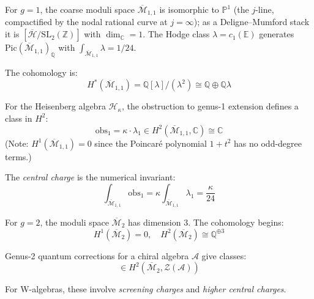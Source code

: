 \begin{example}
\label{ex:genus-1-obstruction-complete}
For $g=1$, the coarse moduli space $\overline{\mathcal{M}}_{1,1}$ is isomorphic to $\mathbb{P}^1$ (the $j$-line, compactified by the nodal rational curve at $j = \infty$); as a Deligne--Mumford stack it is $[\overline{\mathcal{H}}/\mathrm{SL}_2(\mathbb{Z})]$ with $\dim_{\mathbb{C}} = 1$.  The Hodge class $\lambda = c_1(\mathbb{E})$ generates $\mathrm{Pic}(\overline{\mathcal{M}}_{1,1})_{\mathbb{Q}}$ with $\int_{\overline{\mathcal{M}}_{1,1}} \lambda = 1/24$.

The cohomology is:
\begin{equation}
H^*(\overline{\mathcal{M}}_{1,1}) = \mathbb{Q}[\lambda] / (\lambda^2) \cong \mathbb{Q} \oplus \mathbb{Q}\lambda
\end{equation}

For the Heisenberg algebra $\mathcal{H}_\kappa$, the obstruction to genus-1 extension defines a class in $H^2$:
\begin{equation}
\mathrm{obs}_1 = \kappa \cdot \lambda_1 \in H^2(\overline{\mathcal{M}}_{1,1}, \mathbb{C}) \cong \mathbb{C}
\end{equation}
(Note: $H^1(\overline{\mathcal{M}}_{1,1}) = 0$ since the Poincar\'e polynomial $1 + t^2$ has no odd-degree terms.)

The \emph{central charge} is the numerical invariant:
\begin{equation}
\int_{\overline{\mathcal{M}}_{1,1}} \mathrm{obs}_1 = \kappa \int_{\overline{\mathcal{M}}_{1,1}} \lambda_1 = \frac{\kappa}{24}
\end{equation}
\end{example}

\begin{example}
\label{ex:genus-2-obstruction}
For $g=2$, the moduli space $\overline{\mathcal{M}}_2$ has dimension 3. The cohomology begins:
\begin{equation}
H^1(\overline{\mathcal{M}}_2) = 0, \quad H^2(\overline{\mathcal{M}}_2) \cong \mathbb{Q}^{\oplus 3}
\end{equation}

Genus-2 quantum corrections for a chiral algebra $\mathcal{A}$ give classes:
\begin{equation}
[c_2] \in H^2(\overline{\mathcal{M}}_2, \mathcal{Z}(\mathcal{A}))
\end{equation}

For W-algebras, these involve \emph{screening charges} and \emph{higher central charges}.
\end{example}


